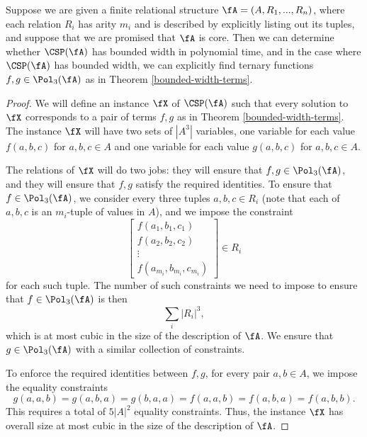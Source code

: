 \begin{thm} Suppose we are given a finite relational structure $\fA = (A, R_1, ..., R_n)$, where each relation $R_i$ has arity $m_i$ and is described by explicitly listing out its tuples, and suppose that we are promised that $\fA$ is core. Then we can determine whether $\CSP(\fA)$ has bounded width in polynomial time, and in the case where $\CSP(\fA)$ has bounded width, we can explicitly find ternary functions $f,g \in \Pol_3(\fA)$ as in Theorem \ref{bounded-width-terms}.
\end{thm}
\begin{proof} We will define an instance $\fX$ of $\CSP(\fA)$ such that every solution to $\fX$ corresponds to a pair of terms $f,g$ as in Theorem \ref{bounded-width-terms}. The instance $\fX$ will have two sets of $|A^3|$ variables, one variable for each value $f(a,b,c)$ for $a,b,c \in A$ and one variable for each value $g(a,b,c)$ for $a,b,c \in A$.

The relations of $\fX$ will do two jobs: they will ensure that $f, g \in \Pol_3(\fA)$, and they will ensure that $f,g$ satisfy the required identities. To ensure that $f \in \Pol_3(\fA)$, we consider every three tuples $a, b, c \in R_i$ (note that each of $a,b,c$ is an $m_i$-tuple of values in $A$), and we impose the constraint
\[
\begin{bmatrix} f(a_1,b_1,c_1)\\ f(a_2,b_2,c_2)\\ \vdots\\ f(a_{m_i}, b_{m_i}, c_{m_i})\end{bmatrix} \in R_i
\]
for each such tuple. The number of such constraints we need to impose to ensure that $f \in \Pol_3(\fA)$ is then
\[
\sum_i |R_i|^3,
\]
which is at most cubic in the size of the description of $\fA$. We ensure that $g \in \Pol_3(\fA)$ with a similar collection of constraints.

To enforce the required identities between $f,g$, for every pair $a,b \in A$, we impose the equality constraints
\[
g(a,a,b) = g(a,b,a) = g(b,a,a) = f(a,a,b) = f(a,b,a) = f(a,b,b).
\]
This requires a total of $5|A|^2$ equality constraints. Thus, the instance $\fX$ has overall size at most cubic in the size of the description of $\fA$.


\end{proof}
